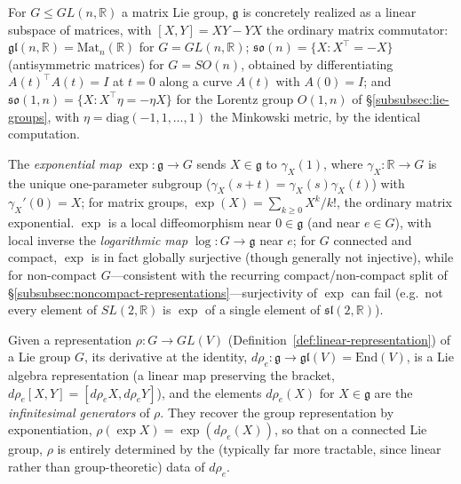 \documentclass[mathematics,review,submit,moreauthors]{Definitions/mdpi}
\begin{document}
\begin{Example}
\label{ex:matrix-lie-algebras}
For $G \leq GL(n,\mathbb{R})$ a matrix Lie group, $\mathfrak{g}$ is
concretely realized as a linear subspace of matrices, with
$[X,Y] = XY - YX$ the ordinary matrix commutator:
$\mathfrak{gl}(n,\mathbb{R}) = \mathrm{Mat}_n(\mathbb{R})$ for
$G = GL(n,\mathbb{R})$; $\mathfrak{so}(n) = \{X : X^\top = -X\}$
(antisymmetric matrices) for $G = SO(n)$, obtained by differentiating
$A(t)^\top A(t) = I$ at $t=0$ along a curve $A(t)$ with $A(0)=I$; and
$\mathfrak{so}(1,n) = \{X : X^\top \eta = -\eta X\}$ for the Lorentz group
$O(1,n)$ of \S\ref{subsubsec:lie-groups}, with $\eta = \mathrm{diag}(-1,1,\dots,1)$
the Minkowski metric, by the identical computation.
\end{Example}

\begin{Definition}
\label{def:exp-log-map}
The \emph{exponential map} $\exp : \mathfrak{g} \to G$ sends $X \in
\mathfrak{g}$ to $\gamma_X(1)$, where $\gamma_X : \mathbb{R} \to G$ is the
unique one-parameter subgroup ($\gamma_X(s+t) = \gamma_X(s)\gamma_X(t)$)
with $\gamma_X'(0) = X$; for matrix groups, $\exp(X) = \sum_{k \geq 0}
X^k/k!$, the ordinary matrix exponential. $\exp$ is a local
diffeomorphism near $0 \in \mathfrak{g}$ (and near $e \in G$), with local
inverse the \emph{logarithmic map} $\log : G \to \mathfrak{g}$ near $e$; for
$G$ connected and compact, $\exp$ is in fact globally surjective (though
generally not injective), while for non-compact $G$---consistent with the
recurring compact/non-compact split of
\S\ref{subsubsec:noncompact-representations}---surjectivity of $\exp$ can
fail (e.g.\ not every element of $SL(2,\mathbb{R})$ is $\exp$ of a single
element of $\mathfrak{sl}(2,\mathbb{R})$).
\end{Definition}

\begin{Definition}
\label{def:infinitesimal-generators}
Given a representation $\rho : G \to GL(V)$
(Definition~\ref{def:linear-representation}) of a Lie group $G$, its
derivative at the identity, $d\rho_e : \mathfrak{g} \to \mathfrak{gl}(V) =
\mathrm{End}(V)$, is a Lie algebra representation (a linear map preserving
the bracket, $d\rho_e[X,Y] = [d\rho_e X, d\rho_e Y]$), and the elements
$d\rho_e(X)$ for $X \in \mathfrak{g}$ are the \emph{infinitesimal
generators} of $\rho$. They recover the group representation by
exponentiation, $\rho(\exp X) = \exp(d\rho_e(X))$, so that on a connected
Lie group, $\rho$ is entirely determined by the (typically far more
tractable, since linear rather than group-theoretic) data of $d\rho_e$.
\end{Definition}
\end{document}
